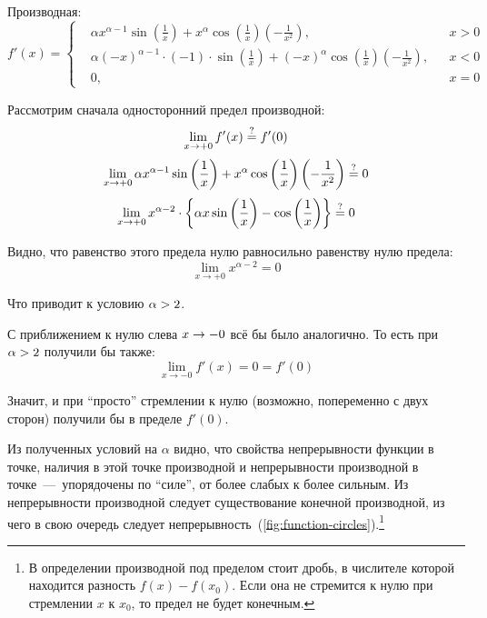 \documentclass[a4paper,12pt]{article}
\begin{document}
\begin{solution}
    Производная:
    \[
      f'(x) = \left\{
        \begin{aligned}
          &\alpha x^{\alpha - 1} \sin{\left(\frac{1}{x}\right)} + x^{\alpha} \cos{\left(\frac{1}{x}\right)} \left(-\frac{1}{x^2}\right), & &x > 0\\
          &\alpha (-x)^{\alpha - 1} \cdot (-1) \cdot \sin{\left(\frac{1}{x}\right)} + (-x)^{\alpha} \cos{\left(\frac{1}{x}\right)} \left(-\frac{1}{x^2}\right), & &x < 0\\
          &0, & &x = 0
        \end{aligned}
      \right.
    \]

    Рассмотрим сначала односторонний предел производной:
    \[
      \lim_{x \to +0} f'(x) \overset{\operatorname{?}}{=} f'(0)
    \]
    \[
      \lim_{x \to +0} \alpha x^{\alpha - 1} \sin{\left(\frac{1}{x}\right)} + x^{\alpha} \cos{\left(\frac{1}{x}\right)} \left(-\frac{1}{x^2}\right) \overset{\operatorname{?}}{=} 0
    \]
    \[
      \lim_{x \to +0} x^{\alpha - 2} \cdot \left\{
        \alpha x \sin{\left(\frac{1}{x}\right)} - \cos{\left(\frac{1}{x}\right)}
      \right\} \overset{\operatorname{?}}{=} 0
    \]

    Видно, что равенство этого предела нулю равносильно равенству нулю предела:
    \[
      \lim_{x \to +0} x^{\alpha - 2} = 0
    \]

    Что приводит к условию $\alpha \hm> 2$.

    С приближением к нулю слева $x \hm\to -0$ всё бы было аналогично.
    То есть при $\alpha \hm> 2$ получили бы также:
    \[
      \lim_{x \to -0} f'(x) = 0 = f'(0)
    \]

    Значит, и при ``просто'' стремлении к нулю (возможно, попеременно с двух сторон) получили бы в пределе $f'(0)$.

    \begin{remark}
      Из полученных условий на $\alpha$ видно, что свойства непрерывности функции в точке, наличия в этой точке производной и непрерывности производной в точке~---~упорядочены по ``силе'', от более слабых к более сильным.
      Из непрерывности производной следует существование конечной производной, из чего в свою очередь следует непрерывность~(\ref{fig:function-circles}).\footnote{
        В определении производной  под пределом стоит дробь, в числителе которой находится разность $f(x) - f(x_0)$.
        Если она не стремится к нулю при стремлении $x$ к $x_0$, то предел не будет конечным.
      }


\end{remark}
\end{solution}
\end{document}

